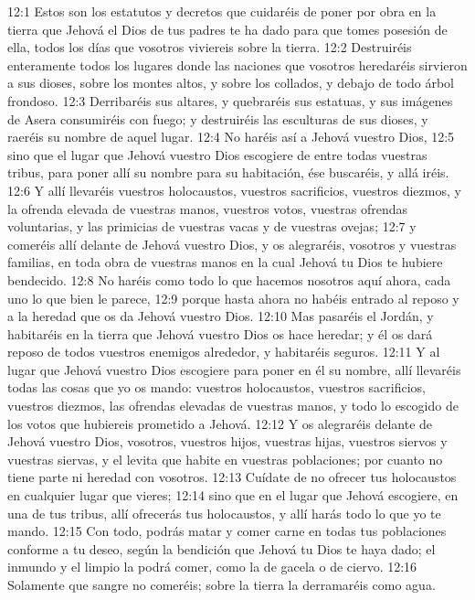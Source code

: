 12:1 Estos son los estatutos y decretos que cuidaréis de poner por obra en la tierra que Jehová el Dios de tus padres te ha dado para que tomes posesión de ella, todos los días que vosotros viviereis sobre la tierra.  
12:2 Destruiréis enteramente todos los lugares donde las naciones que vosotros heredaréis sirvieron a sus dioses, sobre los montes altos, y sobre los collados, y debajo de todo árbol frondoso.  
12:3 Derribaréis sus altares, y quebraréis sus estatuas, y sus imágenes de Asera consumiréis con fuego; y destruiréis las esculturas de sus dioses, y raeréis su nombre de aquel lugar.  
12:4 No haréis así a Jehová vuestro Dios,  
12:5 sino que el lugar que Jehová vuestro Dios escogiere de entre todas vuestras tribus, para poner allí su nombre para su habitación, ése buscaréis, y allá iréis.  
12:6 Y allí llevaréis vuestros holocaustos, vuestros sacrificios, vuestros diezmos, y la ofrenda elevada de vuestras manos, vuestros votos, vuestras ofrendas voluntarias, y las primicias de vuestras vacas y de vuestras ovejas;  
12:7 y comeréis allí delante de Jehová vuestro Dios, y os alegraréis, vosotros y vuestras familias, en toda obra de vuestras manos en la cual Jehová tu Dios te hubiere bendecido.  
12:8 No haréis como todo lo que hacemos nosotros aquí ahora, cada uno lo que bien le parece,  
12:9 porque hasta ahora no habéis entrado al reposo y a la heredad que os da Jehová vuestro Dios.  
12:10 Mas pasaréis el Jordán, y habitaréis en la tierra que Jehová vuestro Dios os hace heredar; y él os dará reposo de todos vuestros enemigos alrededor, y habitaréis seguros.  
12:11 Y al lugar que Jehová vuestro Dios escogiere para poner en él su nombre, allí llevaréis todas las cosas que yo os mando: vuestros holocaustos, vuestros sacrificios, vuestros diezmos, las ofrendas elevadas de vuestras manos, y todo lo escogido de los votos que hubiereis prometido a Jehová.  
12:12 Y os alegraréis delante de Jehová vuestro Dios, vosotros, vuestros hijos, vuestras hijas, vuestros siervos y vuestras siervas, y el levita que habite en vuestras poblaciones; por cuanto no tiene parte ni heredad con vosotros.  
12:13 Cuídate de no ofrecer tus holocaustos en cualquier lugar que vieres;  
12:14 sino que en el lugar que Jehová escogiere, en una de tus tribus, allí ofrecerás tus holocaustos, y allí harás todo lo que yo te mando.  
12:15 Con todo, podrás matar y comer carne en todas tus poblaciones conforme a tu deseo, según la bendición que Jehová tu Dios te haya dado; el inmundo y el limpio la podrá comer, como la de gacela o de ciervo.  
12:16 Solamente que sangre no comeréis; sobre la tierra la derramaréis como agua.  
